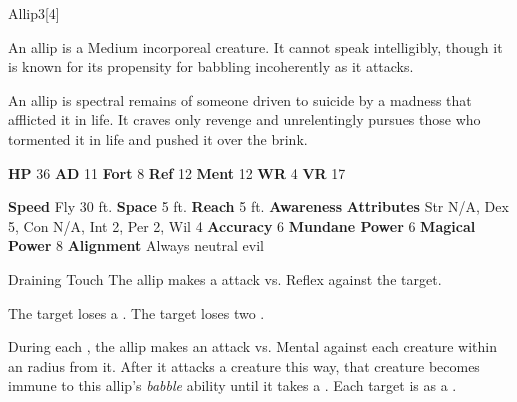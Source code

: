       
  \begin{monsection}{Allip}{3}[4]
    \vspace{-1em}\vspace{-1em}
    \vspace{0em}

    
        An allip is a Medium incorporeal creature.
        It cannot speak intelligibly, though it is known for its propensity for babbling incoherently as it attacks.
      
        An allip is spectral remains of someone driven to suicide by a madness that afflicted it in life.
        It craves only revenge and unrelentingly pursues those who tormented it in life and pushed it over the brink.
      

    \begin{spellcontent}
      \begin{spelltargetinginfo}
        \pari \textbf{HP} 36 \monsep
          \textbf{AD} 11 \monsep
          \textbf{Fort} 8 \monsep
          \textbf{Ref} 12 \monsep
          \textbf{Ment} 12
        \pari \textbf{WR} 4 \monsep
        \textbf{VR} 17
        
      \end{spelltargetinginfo}
    \end{spellcontent}
    \begin{monsterfooter}
      \pari \textbf{Speed} Fly 30 ft. \monsep
        \textbf{Space} 5 ft. \monsep
        \textbf{Reach} 5 ft.
      \pari \textbf{Awareness} 
      \pari \textbf{Attributes}
        Str N/A, Dex 5,
        Con N/A, Int 2,
        Per 2, Wil 4
      \pari \textbf{Accuracy} 6 \monsep
        \textbf{Mundane Power} 6 \monsep
      \textbf{Magical Power} 8
      \pari \textbf{Alignment} Always neutral evil
    \end{monsterfooter}
  \end{monsection}
  \begin{freeability}{Draining Touch}
       The allip makes a  attack
        vs. Reflex against the target.
    
    \hit The target loses a .
    \crit The target loses two .
    \end{freeability}
  
      
          During each , the allip makes an attack vs. Mental against each creature
          within an \arealarge radius  from it.
          After it attacks a creature this way, that creature becomes immune to this allip's \textit{babble} ability until it takes a .
          \hit Each target is  as a .
        
